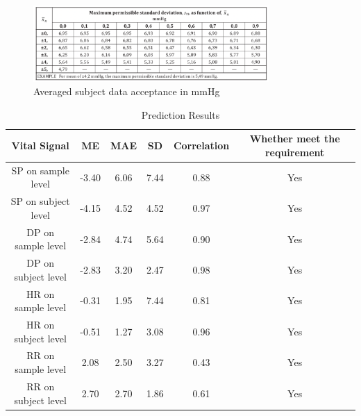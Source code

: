\documentclass{article}
\begin{document}
\begin{figure}[H]
\centering
\includegraphics[width=0.8\textwidth]{./Fig/ME_STD_Correspond.png}
\caption{Averaged subject data acceptance in mmHg}
\label{ME_STD}
\end{figure}

\begin{table}[h!]
\centering
\begin{tabular}{|c|c|c|c|c|c|}
\hline
Vital Signal & ME & MAE & SD & Correlation & Whether meet the requirement\\ \hline


SP on sample level & -3.40 & 6.06 & 7.44 & 0.88 & Yes \\ \hline

SP on subject level & -4.15 & 4.52 & 4.52 & 0.97 & Yes \\ \hline

DP on sample level & -2.84 & 4.74 & 5.64 & 0.90 & Yes \\ \hline

DP on subject level & -2.83 & 3.20 & 2.47 & 0.98 & Yes \\ \hline

HR on sample level & -0.31 & 1.95 & 7.44 & 0.81 & Yes \\ \hline

HR on subject level & -0.51 & 1.27 & 3.08 & 0.96 & Yes \\ \hline

RR on sample level & 2.08 & 2.50 & 3.27 & 0.43 & Yes \\ \hline

RR on subject level & 2.70 & 2.70 & 1.86 & 0.61 & Yes \\ \hline


\end{tabular}
\caption{Prediction Results}
\label{tab:metrics}
\end{table}
\end{document}
